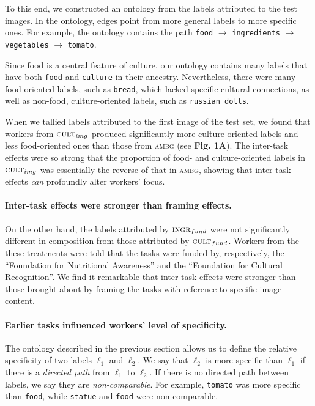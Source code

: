 \documentclass[letterpaper]{article}
\begin{document}
To this end, we constructed an ontology from the labels attributed to the 
test images.  In the ontology, edges point from more general labels to more 
specific ones.  For example, the ontology contains the path \texttt{food} 
$\to$ \texttt{ingredients} $\to$ \texttt{vegetables} $\to$ \texttt{tomato}.

Since food is a central feature 
of culture, our ontology contains many labels that have both \texttt{food}
and \texttt{culture} in their ancestry.  Nevertheless, there were many 
food-oriented labels, such as \texttt{bread}, which lacked specific cultural 
connections, as well as non-food, culture-oriented labels, such as 
\texttt{russian dolls}. 


When we tallied labels attributed to the first image of the test set, 
we found that workers from $\textsc{cult}_{img}$ produced significantly 
more culture-oriented labels and less food-oriented ones than those from
\textsc{ambg} (see \textbf{Fig. 1A}).  The inter-task effects were so 
strong that the proportion of food- and culture-oriented labels in 
$\textsc{cult}_{img}$ was essentially the reverse of that in \textsc{ambg},  
showing that inter-task effects \textit{can} profoundly alter workers' focus. 

\paragraph{Inter-task effects were stronger than framing effects.}
On the other hand, the labels attributed by 
$\textsc{ingr}_{fund}$ were not significantly different in composition from 
those attributed by $\textsc{cult}_{fund}$.  Workers from the
these treatments were told that the tasks were funded by, respectively, 
the ``Foundation for Nutritional Awareness'' and the ``Foundation for Cultural 
Recognition''.  We find it remarkable that inter-task effects were stronger
than those brought about by framing the tasks with reference to specific 
image content.

\paragraph{Earlier tasks influenced workers' level of specificity.} 
The ontology described in the previous section allows us to define the relative
specificity of two labels $\ell_1$ and $\ell_2$. We say that $\ell_2$ is more 
specific than $\ell_1$ if there is a \textit{directed path} from $\ell_1$ to 
$\ell_2$.  If there is no directed path between labels, we say they are  
\textit{non-comparable}.  For example, \texttt{tomato} was more specific than 
\texttt{food}, while \texttt{statue} and \texttt{food} were non-comparable.
\end{document}
